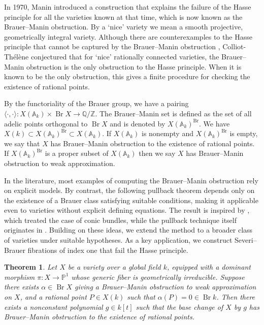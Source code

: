 \documentclass[11pt]{amsart}
\theoremstyle{plain}
\newtheorem{theorem}[thm]{Theorem}
\theoremstyle{definition}
\newcommand{\A}{{\mathbb A}}
\DeclareMathOperator{\Br}{Br}
\begin{document}
	In 1970, Manin introduced a construction that explains the failure of the Hasse principle for all the varieties known at that time, which is now known as the Brauer--Manin obstruction. By a `nice' variety we mean a smooth projective, geometrically integral variety. Although there are counterexamples to the Hasse principle that cannot be captured by the Brauer--Manin obstruction \cite{sko}, Colliot-Th\'{e}l\`ene conjectured that for `nice' rationally connected varieties, the Brauer--Manin obstruction is the only obstruction to the Hasse principle.  When it is known to be the only obstruction, this gives a finite procedure for checking the existence of rational points. 
	
    By the functoriality of the Brauer group, we have a pairing \(\langle \cdot, \cdot \rangle : X(\mathbb{A}_k) \times \Br X \to \mathbb{Q}/\mathbb{Z}\). The Brauer--Manin set is defined as the set of all adelic points orthogonal to $\Br X$ and is denoted by \( X(\A_k)^{\Br} \). We have $X(k) \subset X(\A_k)^{\Br} \subset X(\A_k)$. If $X(\A_k)$ is nonempty and $X(\A_k)^{\Br}$ is empty, we say that $X$ has Brauer--Manin obstruction to the existence of rational points. If $X(\A_k)^{\Br}$ is a proper subset of $X(\A_k)$ then we say $X$ has Brauer--Manin obstruction to weak approximation.

In the literature, most examples of computing the Brauer--Manin obstruction rely on explicit models. By contrast, the following pullback theorem depends only on the existence of a Brauer class satisfying suitable conditions, 
making it applicable even to varieties without explicit defining equations. The result is inspired by \cite[Theorem~7.1]{berg}, which treated the case of conic bundles, while the pullback technique itself originates in \cite{cp}. Building on these ideas, we extend the method to a broader class of varieties under suitable hypotheses. As a key application, we construct Severi--Brauer fibrations of index one that fail 
the Hasse principle.

    
\begin{theorem} \label{pullback}
Let \(X\) be a 
variety over a global field \(k\), equipped with a 
dominant morphism \(\pi : X \to \mathbb{P}^1\) whose generic fiber is 
geometrically irreducible. Suppose there exists 
\(\alpha \in \Br X\) giving a Brauer--Manin obstruction to weak approximation on \(X\), and a rational point \(P \in X(k)\) such that 
\(\alpha(P) = 0 \in \operatorname{Br} k\). Then there exists a nonconstant polynomial \(g \in k[t]\) such that the 
base change of \(X\) by \(g\) has Brauer--Manin obstruction to the 
existence of rational points.
\end{theorem}
\end{document}
